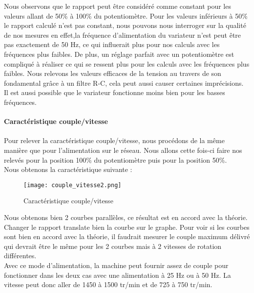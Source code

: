 \documentclass[oneside,a4paper,12pt]{article}
\begin{document}
	Nous observons que le rapport peut être considéré comme constant pour les valeurs allant de 50\% à 100\% du potentiomètre. Pour les valeurs inférieurs à 50\% le rapport calculé n’est pas constant, nous pouvons nous interroger sur la qualité de nos mesures en effet,la fréquence d’alimentation du variateur n’est peut être pas exactement de 50 Hz, ce qui influerait plus pour nos calculs avec les fréquences plus faibles. De plus, un réglage parfait avec un potentiomètre est compliqué à réaliser ce qui se ressent plus pour les calculs avec les fréquences plus faibles. Nous relevons les valeurs efficaces de la tension au travers de son fondamental grâce à un filtre R-C, cela peut aussi causer certaines imprécisions. Il est aussi possible que le variateur fonctionne moins bien pour les basses fréquences.\\
	
	\paragraph{Caractéristique couple/vitesse}\paragraph{}
	
	Pour relever la caractéristique couple/vitesse, nous procédons de la même manière que pour l’alimentation sur le réseau. Nous allons cette fois-ci faire nos relevés pour la position 100\% du potentiomètre puis pour la position 50\%.\\ 
	
	Nous obtenons la caractéristique suivante : \\
	
	\begin{figure}[h]
		\centering
		\texttt{[image: couple\_vitesse2.png]}
		\caption{Caractéristique couple/vitesse}
	\end{figure}

	Nous obtenons bien 2 courbes parallèles, ce résultat est en accord avec la théorie. Changer le rapport translate bien la courbe sur le graphe. Pour voir si les courbes sont bien en accord avec la théorie, il faudrait mesurer le couple maximum délivré qui devrait être le même pour les 2 courbes mais à 2 vitesses de rotation différentes.\\
	Avec ce mode d’alimentation, la machine peut fournir assez de couple pour fonctionner dans les deux cas avec une alimentation à 25 Hz ou à 50 Hz. La vitesse peut donc aller de 1450 à 1500 tr/min et de 725 à 750 tr/min.\\
	
\end{document}
